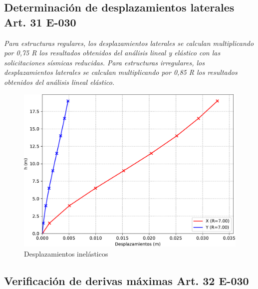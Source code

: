 \documentclass{article}%
\begin{document}
%
\subsection{Determinación de desplazamientos laterales Art. 31 E{-}030}%
\label{subsec:DeterminacindedesplazamientoslateralesArt.31E{-}030}%
\begin{tcolorbox}[colback=gray!5!white,colframe=Maroon!75!black,fonttitle=\bfseries,title=Art. 31.3.1]%
\textit{Para  estructuras  regulares, los  desplazamientos  laterales  se  calculan multiplicando por 0,75 R los resultados obtenidos del análisis lineal y elástico con las solicitaciones sísmicas reducidas. Para estructuras irregulares, los desplazamientos laterales se calculan multiplicando por 0,85 R los resultados obtenidos del análisis lineal elástico.}%
\end{tcolorbox}%


\begin{figure}[H]%
\includegraphics[width=\textwidth]{images/desplazamientos_laterales}%
\caption{Desplazamientos inelásticos}%
\end{figure}

%
\subsection{Verificación de derivas máximas Art. 32 E{-}030}%
\label{subsec:VerificacindederivasmximasArt.32E{-}030}%
\end{document}
